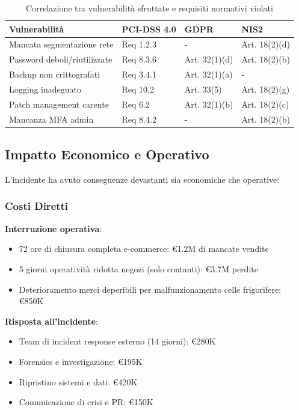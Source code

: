 \begin{table}[h]
\centering
\caption{Correlazione tra vulnerabilità sfruttate e requisiti normativi violati}
\label{tab:vulnerabilita_requisiti}
\begin{tabular}{|p{4cm}|p{3cm}|p{3cm}|p{3cm}|}
\hline
\textbf{Vulnerabilità} & \textbf{PCI-DSS 4.0} & \textbf{GDPR} & \textbf{NIS2} \\
\hline
Mancata segmentazione rete & Req 1.2.3 & - & Art. 18(2)(d) \\
\hline
Password deboli/riutilizzate & Req 8.3.6 & Art. 32(1)(d) & Art. 18(2)(b) \\
\hline
Backup non crittografati & Req 3.4.1 & Art. 32(1)(a) & - \\
\hline
Logging inadeguato & Req 10.2 & Art. 33(5) & Art. 18(2)(g) \\
\hline
Patch management carente & Req 6.2 & Art. 32(1)(b) & Art. 18(2)(c) \\
\hline
Mancanza MFA admin & Req 8.4.2 & - & Art. 18(2)(b) \\
\hline
\end{tabular}
\end{table}

\subsection{Impatto Economico e Operativo}
\label{subsec:4.8.2_impatto}

L'incidente ha avuto conseguenze devastanti sia economiche che operative:

\subsubsection{Costi Diretti}

\textbf{Interruzione operativa}: 
\begin{itemize}
    \item 72 ore di chiusura completa e-commerce: €1.2M di mancate vendite
    \item 5 giorni operatività ridotta negozi (solo contanti): €3.7M perdite
    \item Deterioramento merci deperibili per malfunzionamento celle frigorifere: €850K
\end{itemize}

\textbf{Risposta all'incidente}:
\begin{itemize}
    \item Team di incident response esterno (14 giorni): €280K
    \item Forensics e investigazione: €195K
    \item Ripristino sistemi e dati: €420K
    \item Comunicazione di crisi e PR: €150K
\end{itemize}

